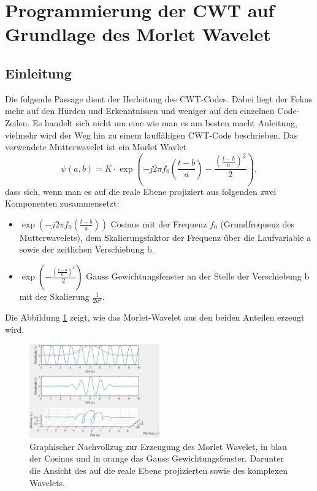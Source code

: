 %
%
%
%
\section{Programmierung der CWT auf Grundlage des Morlet Wavelet 
\label{wavelets:section:teil2}}

\subsection{Einleitung
\label{wavelets:subsection:Einleitung}}
Die folgende Passage dient der Herleitung des CWT-Codes. Dabei liegt der Fokus mehr auf den Hürden und Erkenntnissen und weniger auf den einzelnen Code-Zeilen. Es handelt sich nicht um eine wie man es am besten macht Anleitung, vielmehr wird der Weg hin zu einem lauffähigen CWT-Code beschrieben.
Das verwendete Mutterwavelet ist ein Morlet Wavlet
\begin{equation}
	\psi(a,b)=K\cdot\exp\left(-j2\pi f_0\left(\frac{t-b}{a}\right)-\frac{\left(\frac{t-b}{a}\right)^2}{2}\right),
	\label{wavelets:equation6}
\end{equation}
dass sich, wenn man es auf die reale Ebene projiziert aus folgenden zwei Komponenten zusammensetzt: 

\begin{itemize}
	\item $\exp\left(-j2\pi f_0\left(\frac{t-b}{a}\right)\right)$ Cosinus mit der Frequenz $f_0$ (Grundfrequenz des Mutterwavelets), dem Skalierungsfaktor der Frequenz über die Laufvariable a sowie der zeitlichen Verschiebung b.
	\item $\exp\left(-\frac{\left(\frac{t-b}{a}\right)^2}{2}\right)$	Gauss Gewichtungsfenster an der Stelle der Verschiebung b mit der Skalierung $\frac{1}{2a^2}$.
\end{itemize}

Die Abbildung \ref{wavelet:fig:MorletWavelet} zeigt, wie das Morlet-Wavelet aus den beiden Anteilen erzeugt wird.

\begin{figure}
	\centering
	\includegraphics[width=0.5\textwidth]{papers/wavelets/images/7_MorletWavelet.png}
	\caption{Graphischer Nachvollzug zur Erzeugung des Morlet Wavelet, in blau der Cosinus und in orange das Gauss Gewichtungsfenster. Darunter die Ansicht des auf die reale Ebene projizierten sowie des komplexen Wavelets.}
	\label{wavelet:fig:MorletWavelet}
\end{figure}

